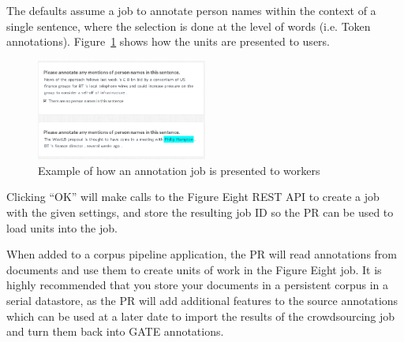 The defaults assume a job to annotate person names within the context of a
single sentence, where the selection is done at the level of words (i.e. Token
annotations).  Figure~\ref{fig:crowd:sample-annotation-job} shows how the units
are presented to users.
\begin{figure}[tb]
  \centering
  \includegraphics[width=0.5\textwidth]{example-cf-annotation-job.png}
  \caption{Example of how an annotation job is presented to workers}
  \label{fig:crowd:sample-annotation-job}
\end{figure}


Clicking ``OK'' will make calls to the Figure Eight REST API to create a job
with the given settings, and store the resulting job ID so the PR can be used
to load units into the job.


When added to a corpus pipeline application, the PR will read annotations from
documents and use them to create units of work in the Figure Eight job.  It is
highly recommended that you store your documents in a persistent corpus in a
serial datastore, as the PR will add additional features to the source
annotations which can be used at a later date to import the results of the
crowdsourcing job and turn them back into GATE annotations.

